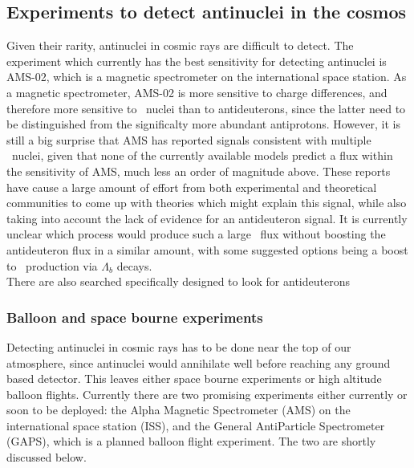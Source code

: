 \subsection{Experiments to detect antinuclei in the cosmos}
Given their rarity, antinuclei in cosmic rays are difficult to detect. The experiment which currently has the best sensitivity for detecting antinuclei is AMS-02, which is a magnetic spectrometer on the international space station. As a magnetic spectrometer, AMS-02 is more sensitive to charge differences, and therefore more sensitive to \ahe\ nuclei than to antideuterons, since the latter need to be distinguished from the significalty more abundant antiprotons. However, it is still a big surprise that AMS has reported signals consistent with multiple \ahe\ nuclei, given that none of the currently available models predict a flux within the sensitivity of AMS, much less an order of magnitude above. These reports have cause a large amount of effort from both experimental and theoretical communities to come up with theories which might explain this signal, while also taking into account the lack of evidence for an antideuteron signal. It is currently unclear which process would produce such a large \ahe\ flux without boosting the antideuteron flux in a similar amount, with some suggested options being a boost to \ahe\ production via $\Lambda_b$ decays\cite{}. \\

There are also searched specifically designed to look for antideuterons
\subsubsection{Balloon and space bourne experiments}
Detecting antinuclei in cosmic rays has to be done near the top of our atmosphere, since antinuclei would annihilate well before reaching any ground based detector. This leaves either space bourne experiments or high altitude balloon flights. Currently there are two promising experiments either currently or soon to be deployed: the Alpha Magnetic Spectrometer (AMS) on the international space station (ISS), and the General AntiParticle Spectrometer (GAPS), which is a planned balloon flight experiment. The two are shortly discussed below.\\

